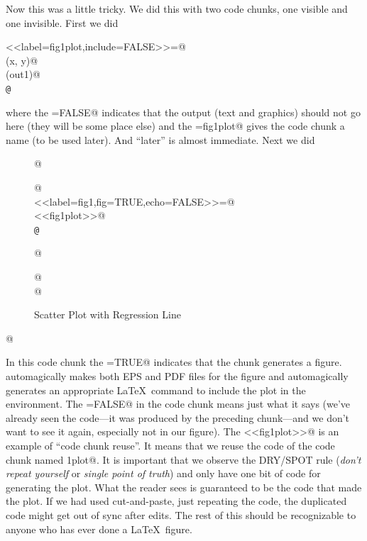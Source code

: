 \documentclass[12pt]{article}
\begin{document}
Now this was a little tricky.  We did this with two code chunks,
one visible and one invisible.  First we did
\begin{tabbing}
\verb@<<label=fig1plot,include=FALSE>>=@ \\
\verb@plot(x, y)@ \\
\verb@abline(out1)@ \\
\verb+@+
\end{tabbing}
where the \verb@include=FALSE@ indicates that the output (text and graphics)
should not go here (they will be some place else) and the \verb@label=fig1plot@
gives the code chunk a name (to be used later).  And ``later'' is almost
immediate.  Next we did
\begin{tabbing}
\verb@\begin{figure}@ \\
\verb@\begin{center}@ \\
\verb@<<label=fig1,fig=TRUE,echo=FALSE>>=@ \\
\verb@<<fig1plot>>@ \\
\verb+@+ \\
\verb@\end{center}@ \\
\verb@\caption{Scatter Plot with Regression Line}@ \\
\verb@\label{fig:one}@ \\
\verb@\end{figure}@
\end{tabbing}
In this code chunk the \verb@fig=TRUE@ indicates that the chunk
generates a figure.  \verb@Sweave@ automagically makes both EPS and PDF
files for the figure and automagically generates an
appropriate \LaTeX\ \verb@{} command
to include the plot in the \verb@figure@ environment.
The \verb@echo=FALSE@ in the code chunk means just what it says
(we've already seen the code---it was produced by the preceding chunk---and
we don't want to see it again, especially not in our figure).
The \verb@<<fig1plot>>@ is an example of ``code chunk reuse''.
It means that we reuse the code of the code chunk named \verb@fig1plot@.
It is important that we observe the DRY/SPOT rule (\emph{don't repeat yourself}
or \emph{single point of truth}) and only have one bit of code for generating
the plot.  What the reader sees is guaranteed to be the code that made the
plot.  If we had used cut-and-paste, just repeating the code, the duplicated
code might get out of sync after edits.
The rest of this should be recognizable to anyone who has ever
done a \LaTeX\ figure.
\end{document}
